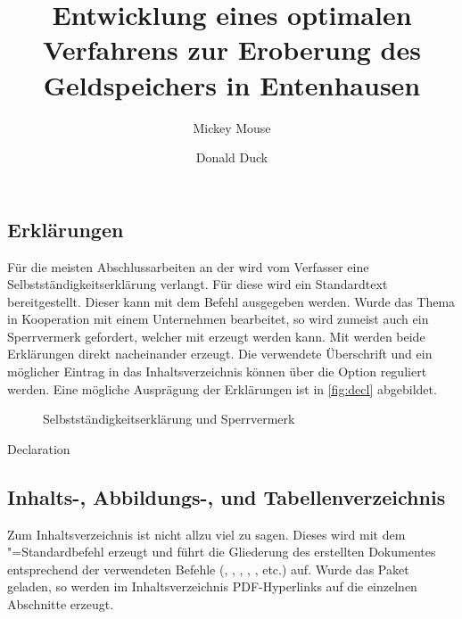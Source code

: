\documentclass[%
  english,ngerman,%
  geometry=no,DIV=12,automark,%
]{tudscrartcl}
\begin{document}
\subsection{Erklärungen}
Für die meisten Abschlussarbeiten an der \TnUD wird vom Verfasser eine 
Selbstständigkeitserklärung verlangt. Für diese wird ein Standardtext 
bereitgestellt. Dieser kann mit dem Befehl  ausgegeben 
werden. Wurde das Thema in Kooperation mit einem Unternehmen bearbeitet, so 
wird zumeist auch ein Sperrvermerk gefordert, welcher mit  
erzeugt werden kann. Mit  werden beide Erklärungen direkt 
nacheinander erzeugt. Die verwendete Überschrift und ein möglicher Eintrag in 
das Inhaltsverzeichnis können über die Option  reguliert 
werden. Eine mögliche Ausprägung der Erklärungen ist in \autoref{fig:decl} 
abgebildet.
%
\begin{figure}
\centering
{}
\caption{Selbstständigkeitserklärung und Sperrvermerk}
\label{fig:decl}
\end{figure}
\begin{Hint!}{Declaration}
\title{%
  Entwicklung eines optimalen Verfahrens zur Eroberung des
  Geldspeichers in Entenhausen
}
\author{Mickey Mouse\and Donald Duck}
\declaration[company=FIRMA]
\end{Hint!}
\begin{Trunk+}
\declaration[company=FIRMA]

\end{Trunk+}

\subsection{Inhalts-, Abbildungs-, und Tabellenverzeichnis}
Zum Inhaltsverzeichnis ist nicht allzu viel zu sagen. Dieses wird mit dem
"=Standardbefehl  erzeugt und führt die 
Gliederung des erstellten Dokumentes entsprechend der verwendeten Befehle 
(, , , , 
,  etc.) auf. Wurde das Paket  
geladen, so werden im Inhaltsverzeichnis PDF-Hyperlinks auf die einzelnen 
Abschnitte erzeugt.
\end{document}
